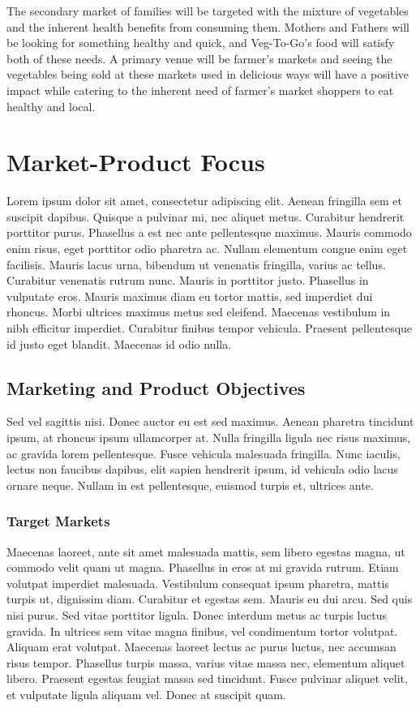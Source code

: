 \documentclass[12pt, letterpaper]{article}
\newcommand{\companyname}{Veg-To-Go}
\begin{document}
The secondary market of families will be targeted with the mixture of vegetables and the inherent health benefits from consuming them.  Mothers and Fathers will be looking for something healthy and quick, and \companyname{}'s food will satisfy both of these needs. A primary venue will be farmer's markets and seeing the vegetables being sold at these markets used in delicious ways will have a positive impact while catering to the inherent need of farmer's market shoppers to eat healthy and local.

\section{Market-Product Focus}
Lorem ipsum dolor sit amet, consectetur adipiscing elit. Aenean fringilla sem et suscipit dapibus. Quisque a pulvinar mi, nec aliquet metus. Curabitur hendrerit porttitor purus. Phasellus a est nec ante pellentesque maximus. Mauris commodo enim risus, eget porttitor odio pharetra ac. Nullam elementum congue enim eget facilisis. Mauris lacus urna, bibendum ut venenatis fringilla, varius ac tellus. Curabitur venenatis rutrum nunc. Mauris in porttitor justo. Phasellus in vulputate eros. Mauris maximus diam eu tortor mattis, sed imperdiet dui rhoncus. Morbi ultrices maximus metus sed eleifend. Maecenas vestibulum in nibh efficitur imperdiet. Curabitur finibus tempor vehicula. Praesent pellentesque id justo eget blandit. Maecenas id odio nulla.
\subsection{Marketing and Product Objectives}
Sed vel sagittis nisi. Donec auctor eu est sed maximus. Aenean pharetra tincidunt ipsum, at rhoncus ipsum ullamcorper at. Nulla fringilla ligula nec risus maximus, ac gravida lorem pellentesque. Fusce vehicula malesuada fringilla. Nunc iaculis, lectus non faucibus dapibus, elit sapien hendrerit ipsum, id vehicula odio lacus ornare neque. Nullam in est pellentesque, euismod turpis et, ultrices ante.
\subsubsection{Target Markets}
Maecenas laoreet, ante sit amet malesuada mattis, sem libero egestas magna, ut commodo velit quam ut magna. Phasellus in eros at mi gravida rutrum. Etiam volutpat imperdiet malesuada. Vestibulum consequat ipsum pharetra, mattis turpis ut, dignissim diam. Curabitur et egestas sem. Mauris eu dui arcu. Sed quis nisi purus. Sed vitae porttitor ligula. Donec interdum metus ac turpis luctus gravida. In ultrices sem vitae magna finibus, vel condimentum tortor volutpat. Aliquam erat volutpat. Maecenas laoreet lectus ac purus luctus, nec accumsan risus tempor. Phasellus turpis massa, varius vitae massa nec, elementum aliquet libero. Praesent egestas feugiat massa sed tincidunt. Fusce pulvinar aliquet velit, et vulputate ligula aliquam vel. Donec at suscipit quam.
\end{document}
